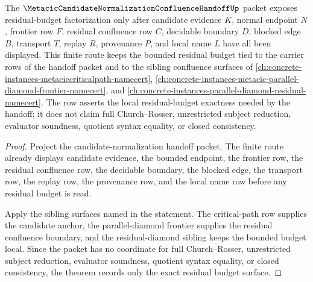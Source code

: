 \begin{theorem}
\label{thm:metacic-candidate-normalization-confluence-handoff-residual-budget-exactness}
The $\MetacicCandidateNormalizationConfluenceHandoffUp$ packet exposes residual-budget factorization only after candidate evidence $K$, normal endpoint $N$, frontier row $F$, residual confluence row $C$, decidable boundary $D$, blocked edge $B$, transport $T$, replay $R$, provenance $P$, and local name $L$ have all been displayed. This finite route keeps the bounded residual budget tied to the carrier rows of the handoff packet and to the sibling confluence surfaces of \autoref{ch:concrete-instances-metaciccriticalpath-namecert}, \autoref{ch:concrete-instances-metacic-parallel-diamond-frontier-namecert}, and \autoref{ch:concrete-instances-parallel-diamond-residual-namecert}. The row asserts the local residual-budget exactness needed by the handoff; it does not claim full Church--Rosser, unrestricted subject reduction, evaluator soundness, quotient syntax equality, or closed consistency.
\end{theorem}
\begin{proof}
Project the candidate-normalization handoff packet. The finite route already displays candidate evidence, the bounded endpoint, the frontier row, the residual confluence row, the decidable boundary, the blocked edge, the transport row, the replay row, the provenance row, and the local name row before any residual budget is read.

Apply the sibling surfaces named in the statement. The critical-path row supplies the candidate anchor, the parallel-diamond frontier supplies the residual confluence boundary, and the residual-diamond sibling keeps the bounded budget local. Since the packet has no coordinate for full Church--Rosser, unrestricted subject reduction, evaluator soundness, quotient syntax equality, or closed consistency, the theorem records only the exact residual budget surface.
\end{proof}

